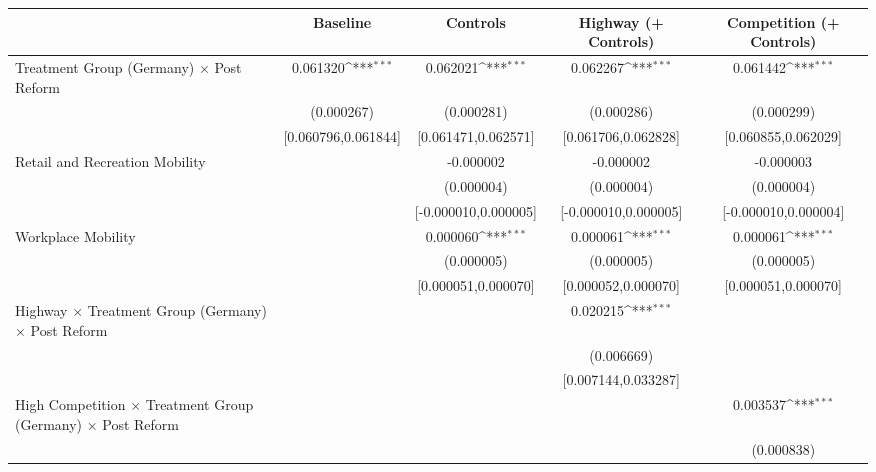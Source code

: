 {
\def\sym#1{\ifmmode^{#1}\else\(^{#1}\)\fi}
\begin{tabular}{l*{4}{c}}
\toprule
                    &\multicolumn{1}{c}{Baseline}&\multicolumn{1}{c}{Controls}&\multicolumn{1}{c}{Highway (+ Controls)}&\multicolumn{1}{c}{Competition (+ Controls)}\\
\midrule
Treatment Group (Germany) $\times$ Post Reform&    0.061320\sym{***}&    0.062021\sym{***}&    0.062267\sym{***}&    0.061442\sym{***}\\
                    &  (0.000267)         &  (0.000281)         &  (0.000286)         &  (0.000299)         \\
                    &[0.060796,0.061844]         &[0.061471,0.062571]         &[0.061706,0.062828]         &[0.060855,0.062029]         \\
Retail and Recreation Mobility&                     &   -0.000002         &   -0.000002         &   -0.000003         \\
                    &                     &  (0.000004)         &  (0.000004)         &  (0.000004)         \\
                    &                     &[-0.000010,0.000005]         &[-0.000010,0.000005]         &[-0.000010,0.000004]         \\
Workplace Mobility  &                     &    0.000060\sym{***}&    0.000061\sym{***}&    0.000061\sym{***}\\
                    &                     &  (0.000005)         &  (0.000005)         &  (0.000005)         \\
                    &                     &[0.000051,0.000070]         &[0.000052,0.000070]         &[0.000051,0.000070]         \\
Highway $\times$ Treatment Group (Germany) $\times$ Post Reform&                     &                     &    0.020215\sym{***}&                     \\
                    &                     &                     &  (0.006669)         &                     \\
                    &                     &                     &[0.007144,0.033287]         &                     \\
High Competition $\times$ Treatment Group (Germany) $\times$ Post Reform&                     &                     &                     &    0.003537\sym{***}\\
                    &                     &                     &                     &  (0.000838)         \\

\end{tabular}}
